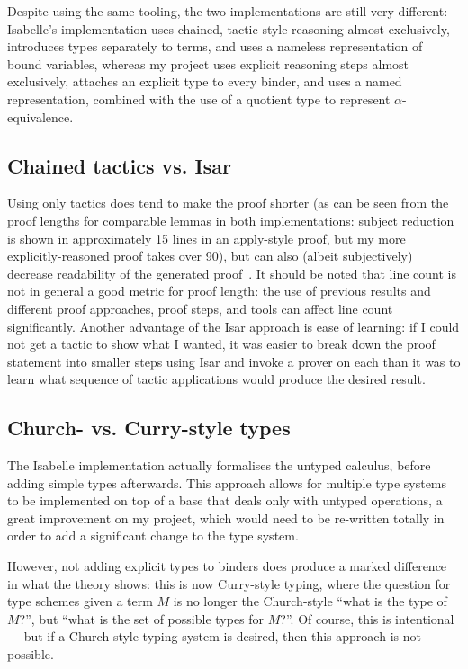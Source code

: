 Despite using the same tooling, the two implementations are still very different: Isabelle's implementation uses chained, tactic-style reasoning almost exclusively, introduces types separately to terms, and uses a nameless representation of bound variables, whereas my project uses explicit reasoning steps almost exclusively, attaches an explicit type to every binder, and uses a named representation, combined with the use of a quotient type to represent \(\alpha\)-equivalence.

\subsection{Chained tactics vs. Isar}
Using only tactics does tend to make the proof shorter (as can be seen from the proof lengths for comparable lemmas in both implementations: subject reduction is shown in approximately 15 lines in an apply-style proof, but my more explicitly-reasoned proof takes over 90), but can also (albeit subjectively) decrease readability of the generated proof~\cite{isar-phd}.
It should be noted that line count is not in general a good metric for proof length: the use of previous results and different proof approaches, proof steps, and tools can affect line count significantly.
Another advantage of the Isar approach is ease of learning: if I could not get a tactic to show what I wanted, it was easier to break down the proof statement into smaller steps using Isar and invoke a prover on each than it was to learn what sequence of tactic applications would produce the desired result.

\subsection{Church- vs. Curry-style types}
The Isabelle implementation actually formalises the untyped calculus, before adding simple types afterwards.
This approach allows for multiple type systems to be implemented on top of a base that deals only with untyped operations, a great improvement on my project, which would need to be re-written totally in order to add a significant change to the type system.

However, not adding explicit types to binders does produce a marked difference in what the theory shows: this is now Curry-style typing, where the question for type schemes given a term \(M\) is no longer the Church-style ``what is the type of \(M\)?'', but ``what is the set of possible types for \(M\)?''.
Of course, this is intentional --- but if a Church-style typing system is desired, then this approach is not possible.

